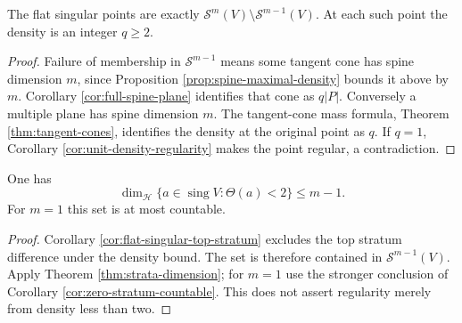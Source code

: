 \begin{corollary}\label{cor:flat-singular-top-stratum}
The flat singular points are exactly $\mathcal S^m(V)\setminus\mathcal S^{m-1}(V)$. At each such point the density is an integer $q\geq2$.
\end{corollary}
\begin{proof}
Failure of membership in $\mathcal S^{m-1}$ means some tangent cone has spine dimension $m$, since Proposition \ref{prop:spine-maximal-density} bounds it above by $m$. Corollary \ref{cor:full-spine-plane} identifies that cone as $q|P|$. Conversely a multiple plane has spine dimension $m$. The tangent-cone mass formula, Theorem \ref{thm:tangent-cones}, identifies the density at the original point as $q$. If $q=1$, Corollary \ref{cor:unit-density-regularity} makes the point regular, a contradiction.
\end{proof}

\begin{corollary}\label{cor:subtwo-singular-dimension}
One has
\[
 \dim_{\mathcal H}\{a\in\operatorname{sing}V:\Theta(a)<2\}\leq m-1.
\]
For $m=1$ this set is at most countable.
\end{corollary}
\begin{proof}
Corollary \ref{cor:flat-singular-top-stratum} excludes the top stratum difference under the density bound. The set is therefore contained in $\mathcal S^{m-1}(V)$. Apply Theorem \ref{thm:strata-dimension}; for $m=1$ use the stronger conclusion of Corollary \ref{cor:zero-stratum-countable}. This does not assert regularity merely from density less than two.
\end{proof}
